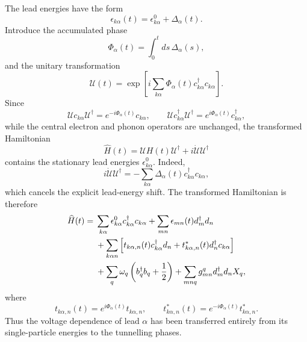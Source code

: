 \documentclass[
 reprint,
 superscriptaddress,
 amsmath,amssymb,
 aps,prb,
 longbibliography,
 floatfix
]{revtex4-2}
\begin{document}
The lead energies have the form
\begin{equation*}
\epsilon_{k\alpha}(t)
=
\epsilon_{k\alpha}^{0}
+
\Delta_\alpha(t).
\end{equation*}
Introduce the accumulated phase
\begin{equation*}
\Phi_\alpha(t)
=
\int_{0}^{t}ds\,\Delta_\alpha(s),
\end{equation*}
and the unitary transformation
\begin{equation*}
\mathcal U(t)
=
\exp\!\left[
i\sum_{k\alpha}
\Phi_\alpha(t)c_{k\alpha}^{\dagger}c_{k\alpha}
\right].
\end{equation*}
Since
\begin{equation*}
\mathcal U c_{k\alpha}\mathcal U^\dagger
=
e^{-i\Phi_\alpha(t)}c_{k\alpha},
\qquad
\mathcal U c_{k\alpha}^{\dagger}\mathcal U^\dagger
=
e^{i\Phi_\alpha(t)}c_{k\alpha}^{\dagger},
\end{equation*}
while the central electron and phonon operators are unchanged, the transformed Hamiltonian
\begin{equation*}
\widehat H(t)
=
\mathcal U H(t)\mathcal U^\dagger
+
i\dot{\mathcal U}\mathcal U^\dagger
\end{equation*}
contains the stationary lead energies \(\epsilon_{k\alpha}^{0}\).
Indeed,
\begin{equation*}
i\dot{\mathcal U}\mathcal U^\dagger
=
-\sum_{k\alpha}
\Delta_\alpha(t)c_{k\alpha}^{\dagger}c_{k\alpha},
\end{equation*}
which cancels the explicit lead-energy shift. The transformed Hamiltonian is therefore
\begin{align}
\widehat H(t)
={}&
\sum_{k\alpha}
\epsilon_{k\alpha}^{0}
c_{k\alpha}^{\dagger}c_{k\alpha}
+
\sum_{mn}
\epsilon_{mn}(t)d_m^{\dagger}d_n
\notag\\
&+
\sum_{k\alpha n}
\left[
t_{k\alpha,n}(t)c_{k\alpha}^{\dagger}d_n
+
t_{k\alpha,n}^{*}(t)d_n^{\dagger}c_{k\alpha}
\right]
\notag\\
&+
\sum_q
\omega_q
\left(
b_q^{\dagger}b_q+\frac12
\right)
+
\sum_{mnq}
g_{mn}^{q}
d_m^{\dagger}d_n
X_q ,
\label{eq:transformed-Hamiltonian}
\end{align}
where
\begin{equation}
t_{k\alpha,n}(t)
=
e^{i\Phi_\alpha(t)}t_{k\alpha,n},
\qquad
t_{k\alpha,n}^{*}(t)
=
e^{-i\Phi_\alpha(t)}t_{k\alpha,n}^{*}.
\label{eq:pf-hopping-phase}
\end{equation}
Thus the voltage dependence of lead \(\alpha\) has been transferred entirely from its single-particle energies to the tunnelling phases.
\end{document}
